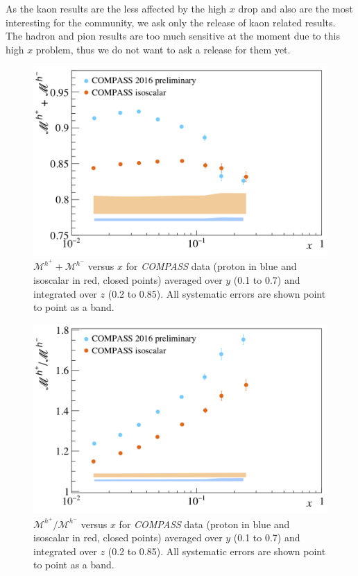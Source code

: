 \documentclass[letterpaper,12pt]{article}
\begin{document}
As the kaon results are the less affected by the high $x$ drop and also are the most interesting for the community, we ask only the release of kaon related results. The hadron and pion results are too much sensitive at the moment due to this high $x$ problem, thus we do not want to ask a release for them yet.

\newpage

\begin{figure}[H]
	\centering
	\includegraphics[scale=0.55]{./gfx/hs.png}
	\caption{$\mathscr{M}^{h^+}+\mathscr{M}^{h^-}$ versus $x$ for \textit{COMPASS} data (proton in blue and isoscalar in red, closed points) averaged over $y$ (0.1 to 0.7) and integrated over $z$ (0.2 to 0.85). All systematic errors are shown point to point as a band.}
	\label{hs}
\end{figure}

\begin{figure}[H]
	\centering
	\includegraphics[scale=0.55]{./gfx/hr.png}
	\caption{$\mathscr{M}^{h^+}/\mathscr{M}^{h^-}$ versus $x$ for \textit{COMPASS} data (proton in blue and isoscalar in red, closed points) averaged over $y$ (0.1 to 0.7) and integrated over $z$ (0.2 to 0.85). All systematic errors are shown point to point as a band.}
	\label{hr}
\end{figure}
\end{document}
